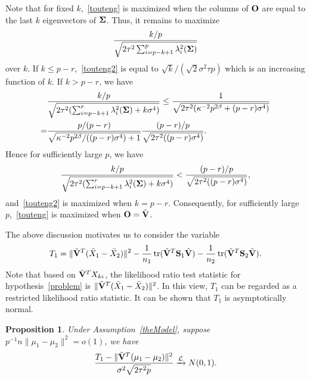 \documentclass[review]{elsarticle}
\DeclareMathOperator{\mytr}{tr}
\theoremstyle{plain}
\newtheorem{proposition}{\quad\quad Proposition}
\theoremstyle{definition}
\theoremstyle{remark}
\begin{document}
Note that for fixed $k$,~\eqref{touteng} is maximized when the columns of $\mathbf{O}$ are equal to the last $k$ eigenvectors of $\boldsymbol{\Sigma}$.
Thus, it remains to maximize
\begin{equation}\label{touteng2}
\frac{k/p}{\sqrt{2\tau^2\sum_{i=p-k+1}^p \lambda_i^2 (\boldsymbol{\Sigma})}}
\end{equation}
over $k$.
If $k\leq p-r$,~\eqref{touteng2} is equal to $\sqrt{k}/(\sqrt{2} \sigma^2 \tau p)$ which is an increasing function of $k$.
If $k> p-r$, we have
\begin{equation*}
    \begin{aligned}
        &\frac{k/p}{\sqrt{2\tau^2(\sum_{i=p-k+1}^r \lambda_i^2(\boldsymbol{\Sigma})+k\sigma^4)}}
        \leq
        \frac{1}{\sqrt{2\tau^2(\kappa^{-2}p^{2\beta}+(p-r)\sigma^4)}}\\
        =&
        \frac{p/(p-r)}{\sqrt{\kappa^{-2}p^{2\beta}/((p-r)\sigma^4)+1}}
\frac{(p-r)/p}{\sqrt{2\tau^2((p-r)\sigma^4)}}.
    \end{aligned}
\end{equation*}
Hence for sufficiently large $p$, we have
\begin{equation*}
    \begin{aligned}
        \frac{k/p}{\sqrt{2\tau^2(\sum_{i=p-k+1}^r \lambda_i^2(\boldsymbol{\Sigma})+k\sigma^4)}}
        <
\frac{(p-r)/p}{\sqrt{2\tau^2((p-r)\sigma^4)}},
    \end{aligned}
\end{equation*}
and~\eqref{touteng2} is maximized when $k=p-r$.
Consequently, for sufficiently large $p$,~\eqref{touteng} is maximized when $\mathbf{O}=\tilde{\mathbf{V}}$.

The above discussion motivates us to consider the variable
\begin{equation*}
\begin{aligned}
    T_1=\|\tilde{\BV}^T(\bar{X}_1-\bar{X}_2)\|^2-\frac{1}{n_1}\mytr(\tilde{\BV}^T \BS_1\tilde{\BV})-\frac{1}{n_2}\mytr(\tilde{\BV}^T \BS_2\tilde{\BV}).
    \\
\end{aligned}
\end{equation*}
 Note that based on $\tilde{\mathbf{V}}^T X_{ki}$, the likelihood ratio test statistic for hypothesis~\eqref{problem} is 
    $\|\tilde{\mathbf{V}}^T (\bar{X}_1-\bar{X}_2)\|^2$. 
    In this view, $T_1$ can be regarded as a restricted likelihood ratio statistic.
It can be shown that $T_1$ is asymptotically normal.
\begin{proposition}\label{oracleTheorem}
    Under Assumption~\ref{theModel}, suppose ${p}^{-1}{n}\|\mu_1-\mu_2\|^2= o(1)$, we have 
    \begin{equation*}
        \frac{T_1-\|\tilde{\mathbf{V}}^T(\mu_1-\mu_2)\|^2}
        {\sigma^2\sqrt{2\tau^2 p}}\xrightarrow{\mathcal{L}}N(0,1).
    \end{equation*}
\end{proposition}
\end{document}
